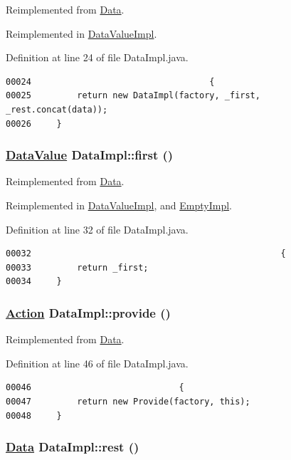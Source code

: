 Reimplemented from \hyperlink{interfaceData_a0}{Data}.

Reimplemented in \hyperlink{classDataValueImpl_a3}{Data\-Value\-Impl}.

Definition at line 24 of file Data\-Impl.java.\footnotesize\begin{verbatim}00024                                   {
00025         return new DataImpl(factory, _first, _rest.concat(data));
00026     }
\end{verbatim}\normalsize 
\hypertarget{classDataImpl_a2}{
\subsubsection[first]{\setlength{\rightskip}{0pt plus 5cm}\hyperlink{interfaceDataValue}{Data\-Value} Data\-Impl::first ()}}
\label{classDataImpl_a2}




Reimplemented from \hyperlink{interfaceData_a2}{Data}.

Reimplemented in \hyperlink{classDataValueImpl_a0}{Data\-Value\-Impl}, and \hyperlink{classEmptyImpl_a0}{Empty\-Impl}.

Definition at line 32 of file Data\-Impl.java.\footnotesize\begin{verbatim}00032                                                 {
00033         return _first;
00034     }
\end{verbatim}\normalsize 
\hypertarget{classDataImpl_a5}{
\subsubsection[provide]{\setlength{\rightskip}{0pt plus 5cm}\hyperlink{interfaceAction}{Action} Data\-Impl::provide ()}}
\label{classDataImpl_a5}




Reimplemented from \hyperlink{interfaceData_a5}{Data}.

Definition at line 46 of file Data\-Impl.java.\footnotesize\begin{verbatim}00046                             {
00047         return new Provide(factory, this);
00048     }
\end{verbatim}\normalsize 
\hypertarget{classDataImpl_a3}{
\subsubsection[rest]{\setlength{\rightskip}{0pt plus 5cm}\hyperlink{interfaceData}{Data} Data\-Impl::rest ()}}
\label{classDataImpl_a3}




